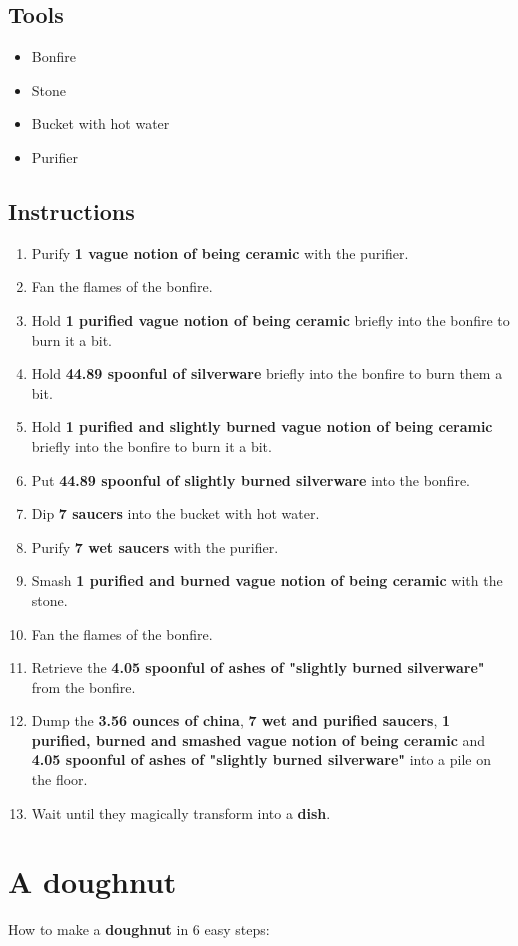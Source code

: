 \documentclass{article}
\begin{document}
\subsection{Tools}\begin{itemize}
\item 
Bonfire
\item 
Stone
\item 
Bucket with hot water
\item 
Purifier
\end{itemize}
\subsection{Instructions}\begin{enumerate}
\item 
Purify \textbf{1 vague notion of being ceramic} with the purifier.
\item 
Fan the flames of the bonfire.
\item 
Hold \textbf{1 purified vague notion of being ceramic} briefly into the bonfire to burn it a bit.
\item 
Hold \textbf{44.89 spoonful of silverware} briefly into the bonfire to burn them a bit.
\item 
Hold \textbf{1 purified and slightly burned vague notion of being ceramic} briefly into the bonfire to burn it a bit.
\item 
Put \textbf{44.89 spoonful of slightly burned silverware} into the bonfire.
\item 
Dip \textbf{7 saucers} into the bucket with hot water.
\item 
Purify \textbf{7 wet saucers} with the purifier.
\item 
Smash \textbf{1 purified and burned vague notion of being ceramic} with the stone.
\item 
Fan the flames of the bonfire.
\item 
Retrieve the \textbf{4.05 spoonful of ashes of "slightly burned silverware"} from the bonfire.
\item 
Dump the \textbf{3.56 ounces of china}, \textbf{7 wet and purified saucers}, \textbf{1 purified, burned and smashed vague notion of being ceramic} and \textbf{4.05 spoonful of ashes of "slightly burned silverware"} into a pile on the floor.
\item 
Wait until they magically transform into a \textbf{dish}.
\end{enumerate}
\newpage
\section{A doughnut}How to make a \textbf{doughnut} in 6 easy steps:
\end{document}
